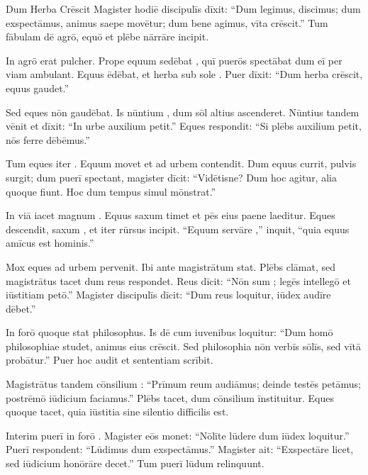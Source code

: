 \documentclass[12pt]{nextbook}
\begin{document}
\begin{readersection}{Dum Herba Crēscit}
Magister hodiē discipulīs dīxit: “Dum legimus, discimus; dum exspectāmus, animus saepe movētur; dum bene agimus, vīta crēscit.” Tum fābulam dē agrō, equō et plēbe nārrāre incipit.

In agrō erat  pulcher. Prope equum sedēbat , quī puerōs spectābat dum eī per viam ambulant. Equus  ēdēbat, et herba sub sole . Puer dīxit: “Dum herba crēscit, equus gaudet.”

Sed eques nōn gaudēbat. Is nūntium , dum sōl altius ascenderet. Nūntius tandem vēnit et dīxit: “In urbe  auxilium petit.” Eques respondit: “Si plēbs auxilium petit, nōs  ferre dēbēmus.”

Tum eques iter . Equum movet et ad urbem contendit. Dum equus currit, pulvis surgit; dum puerī spectant, magister dīcit: “Vidētisne? Dum hoc agitur, alia quoque fiunt. Hoc dum tempus simul mōnstrat.”

In viā iacet magnum . Equus saxum timet et pēs eius paene laeditur. Eques descendit, saxum , et iter rūrsus incipit. “Equum servāre ,” inquit, “quia equus amīcus est hominis.”

Mox eques ad urbem pervenit. Ibi  ante magistrātum stat. Plēbs clāmat, sed magistrātus tacet dum reus respondet. Reus dīcit: “Nōn sum ; legēs intellegō et iūstitiam petō.” Magister discipulīs dīcit: “Dum reus loquitur, iūdex audīre dēbet.”

In forō quoque stat philosophus. Is dē  cum iuvenibus loquitur: “Dum homō philosophiae studet, animus eius crēscit. Sed philosophia nōn verbīs sōlīs, sed vītā probātur.” Puer hoc audit et sententiam scrībit.

Magistrātus tandem cōnsilium : “Prīmum reum audiāmus; deinde testēs petāmus; postrēmō iūdicium faciamus.” Plēbs tacet, dum cōnsilium īnstituitur. Eques quoque tacet, quia iūstitia sine silentio difficilis est.

Interim puerī in forō . Magister eōs monet: “Nōlīte lūdere dum iūdex loquitur.” Puerī respondent: “Lūdimus dum exspectāmus.” Magister ait: “Exspectāre licet, sed iūdicium honōrāre decet.” Tum puerī lūdum relinquunt.


\end{readersection}
\end{document}
